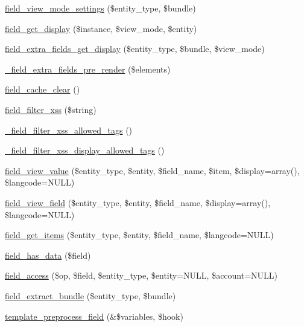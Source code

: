 \begin{DoxyCompactItemize}
\item 
\hyperlink{group__field_ga43d37035f8764e021f18821d46a92341}{field\_\-view\_\-mode\_\-settings} (\$entity\_\-type, \$bundle)
\item 
\hyperlink{group__field_ga2dca22263fe45c35bceca2186c7ccc77}{field\_\-get\_\-display} (\$instance, \$view\_\-mode, \$entity)
\item 
\hyperlink{group__field_ga3ec2b23abfecffb6a85e203b6233b84b}{field\_\-extra\_\-fields\_\-get\_\-display} (\$entity\_\-type, \$bundle, \$view\_\-mode)
\item 
\hyperlink{group__field_gaf9008661a037c20fca58ad9738495325}{\_\-field\_\-extra\_\-fields\_\-pre\_\-render} (\$elements)
\item 
\hyperlink{group__field_ga48d2c3c37e58251cd5abb49d38f8f039}{field\_\-cache\_\-clear} ()
\item 
\hyperlink{group__field_ga181095248684b8b5a45c08ab8d22a813}{field\_\-filter\_\-xss} (\$string)
\item 
\hyperlink{group__field_ga7ae8de4fae20a2142bb4c8d1e007cda5}{\_\-field\_\-filter\_\-xss\_\-allowed\_\-tags} ()
\item 
\hyperlink{group__field_ga047cdec864ecb94587790aa3ed5fbd18}{\_\-field\_\-filter\_\-xss\_\-display\_\-allowed\_\-tags} ()
\item 
\hyperlink{group__field_gab716b21eb481e4f9d9f5f2af71093d81}{field\_\-view\_\-value} (\$entity\_\-type, \$entity, \$field\_\-name, \$item, \$display=array(), \$langcode=NULL)
\item 
\hyperlink{group__field_gacb7c7349bbe181c174421e23210ae1ba}{field\_\-view\_\-field} (\$entity\_\-type, \$entity, \$field\_\-name, \$display=array(), \$langcode=NULL)
\item 
\hyperlink{group__field_ga32f621685ff4bccfb3fa51e43f27ea57}{field\_\-get\_\-items} (\$entity\_\-type, \$entity, \$field\_\-name, \$langcode=NULL)
\item 
\hyperlink{group__field_ga7545752dd04141d053f69416742a1ea4}{field\_\-has\_\-data} (\$field)
\item 
\hyperlink{group__field_gad363d4b50f9326e85cbf1180cd848b3b}{field\_\-access} (\$op, \$field, \$entity\_\-type, \$entity=NULL, \$account=NULL)
\item 
\hyperlink{group__field_gade5f766418eabc45894d745b3b4541c4}{field\_\-extract\_\-bundle} (\$entity\_\-type, \$bundle)
\item 
\hyperlink{group__field_ga6dc60d3c482230f380dd3b112487d717}{template\_\-preprocess\_\-field} (\&\$variables, \$hook)
\item 

\end{DoxyCompactItemize}
